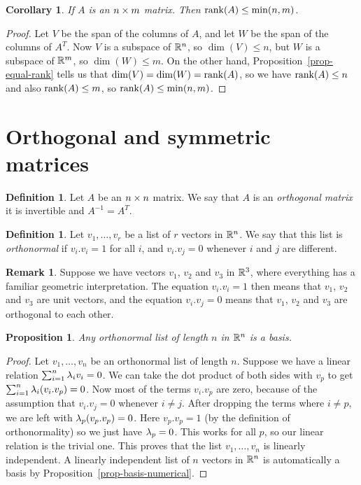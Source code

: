 \documentclass[reqno]{amsart}
\newtheorem{proposition}[theorem]{Proposition}
\newtheorem{corollary}[theorem]{Corollary}
\theoremstyle{definition}
\newtheorem{remark}[theorem]{Remark}
\newtheorem{definition}[theorem]{Definition}
\newcommand{\dfn}[1]{\emph{{#1}}\index{#1}}
\begin{document}
\begin{corollary}\label{cor-max-rank}
 If $A$ is an $n\times m$ matrix.  Then $\operatorname{rank}(A)\leq\min(n,m)$.
\end{corollary}
\begin{proof}
 Let $V$ be the span of the columns of $A$, and let $W$ be the span of
 the columns of $A^T$.  Now $V$ is a subspace of ${\mathbb{R}}^n$, so
 $\dim(V)\leq n$, but $W$ is a subspace of ${\mathbb{R}}^m$, so $\dim(W)\leq
 m$.  On the other hand, Proposition~\ref{prop-equal-rank} tells us
 that $\dim(V)=\dim(W)=\operatorname{rank}(A)$, so we have $\operatorname{rank}(A)\leq n$ and also
 $\operatorname{rank}(A)\leq m$, so $\operatorname{rank}(A)\leq\min(n,m)$.
\end{proof}

\section{Orthogonal and symmetric matrices}
\label{sec-symmetric}

\begin{definition}\label{defn-orthogonal}
 Let $A$ be an $n\times n$ matrix.  We say that $A$ is an
 \dfn{orthogonal matrix} it is invertible and $A^{-1}=A^T$.
\end{definition}

\begin{definition}\label{defn-orthonormal}
 Let $v_1,\dotsc,v_r$ be a list of $r$ vectors in ${\mathbb{R}}^n$.  We say that
 this list is \dfn{orthonormal} if $v_i.v_i=1$ for all $i$, and
 $v_i.v_j=0$ whenever $i$ and $j$ are different.
\end{definition}

\begin{remark}
 Suppose we have vectors $v_1$, $v_2$ and $v_3$ in ${\mathbb{R}}^3$, where
 everything has a familiar geometric interpretation.  The equation
 $v_i.v_i=1$ then means that $v_1$, $v_2$ and $v_3$ are unit vectors,
 and the equation $v_i.v_j=0$ means that $v_1$, $v_2$ and $v_3$ are
 orthogonal to each other.
\end{remark}

\begin{proposition}\label{prop-orthonormal-basis}
 Any orthonormal list of length $n$ in ${\mathbb{R}}^n$ is a basis.
\end{proposition}
\begin{proof}
 Let $v_1,\dotsc,v_n$ be an orthonormal list of length $n$.  Suppose
 we have a linear relation $\sum_{i=1}^n\lambda_iv_i=0$.  We can take the
 dot product of both sides with $v_p$ to get
 $\sum_{i=1}^n\lambda_i(v_i.v_p)=0$.  Now most of the terms $v_i.v_p$ are
 zero, because of the assumption that $v_i.v_j=0$ whenever $i\neq j$.
 After dropping the terms where $i\neq p$, we are left with
 $\lambda_p(v_p.v_p)=0$.  Here $v_p.v_p=1$ (by the definition of
 orthonormality) so we just have $\lambda_p=0$.  This works for all $p$,
 so our linear relation is the trivial one.  This proves that the list
 $v_1,\dotsc,v_n$ is linearly independent.  A linearly independent
 list of $n$ vectors in ${\mathbb{R}}^n$ is automatically a basis by
 Proposition~\ref{prop-basis-numerical}. 
\end{proof}
\end{document}
